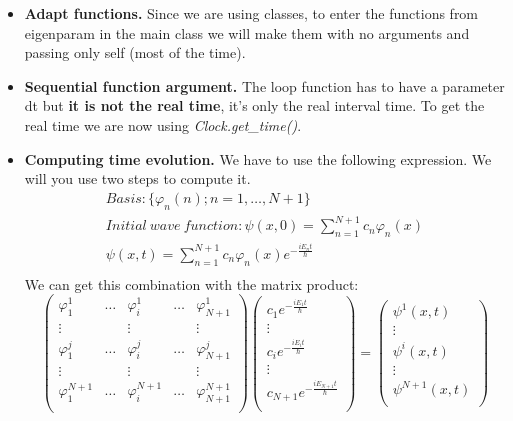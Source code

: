 \documentclass{article}
\begin{document}
\begin{itemize}
	
	\item  \textbf{Adapt functions.} Since we are using classes, to enter the functions from eigenparam in the main class we will make them with no arguments and passing only self (most of the time).
	\item \textbf{Sequential function argument.} The loop function has to have a parameter dt but \textbf{it is not the real time}, it's only the real interval time. To get the real time we are now using \textit{Clock.get\_time()}.
	\item \textbf{Computing time evolution.} We have to use the following expression. We will you use two steps to compute it.
	\[
	\begin{gathered}
	Basis: \{\varphi_n (n); n = 1, \dots, N + 1 \}\\
	Initial\ wave\ function: \psi(x,0)=\sum_{n=1}^{N+1}c_n\varphi_n(x)\\
	\psi(x,t) = \sum_{n=1}^{N+1} c_n \varphi_n (x)e^{-\frac{iE_nt}{\hbar}}\\
	\end{gathered}
	\]
	We can get this combination with the matrix product:
	\[
	\begin{pmatrix}
	\varphi_1^1& \dots & \varphi_i^1 & \dots &  \varphi_{N+1}^1 \\
	\vdots &  & \vdots & & \vdots \\
	\varphi_1^j & \dots &\varphi_i^j& \dots & \varphi_{N+1}^j \\
	\vdots &  & \vdots & & \vdots \\
	\varphi_1^{N+1} &\dots &\varphi_i^{N+1}& \dots & \varphi_{N+1}^{N+1} \\
	\end{pmatrix}
	\begin{pmatrix}
	c_1 e^{-\frac{iE_1t}{\hbar}}\\
	\vdots\\
	c_i e^{-\frac{iE_it}{\hbar}}\\
	\vdots\\
	c_{N + 1} e^{-\frac{iE_{N + 1}t}{\hbar}}\\
	\end{pmatrix}
	=
	\begin{pmatrix}
	\psi^1(x,t)\\
	\vdots\\
	\psi^i(x,t)\\
	\vdots\\
	\psi^{N + 1}(x,t)\\

\end{pmatrix}\]
\end{itemize}
\end{document}
